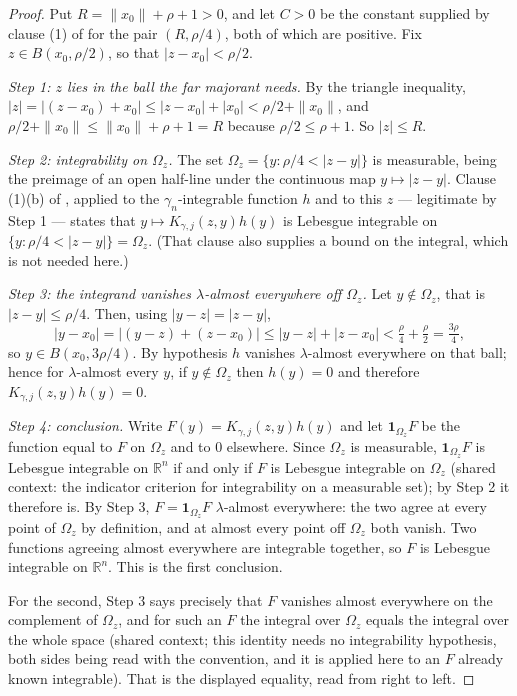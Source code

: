 \begin{proof}
Put $R = \|x_0\| + \rho + 1 > 0$, and let $C > 0$ be the constant supplied by clause (1) of
 for the pair $(R,\rho/4)$, both of which are positive.
Fix $z \in B(x_0,\rho/2)$, so that $|z - x_0| < \rho/2$.

\emph{Step 1: $z$ lies in the ball the far majorant needs.}
By the triangle inequality, $|z| = |(z-x_0) + x_0| \leq |z-x_0| + |x_0| < \rho/2 + \|x_0\|$,
and $\rho/2 + \|x_0\| \leq \|x_0\| + \rho + 1 = R$ because $\rho/2 \leq \rho + 1$.  So
$|z| \leq R$.

\emph{Step 2: integrability on $\Omega_z$.}
The set $\Omega_z = \{y : \rho/4 < |z-y|\}$ is measurable, being the preimage of an open
half-line under the continuous map $y \mapsto |z-y|$.  Clause (1)(b) of
, applied to the $\gamma_n$-integrable function $h$ and to
this $z$ --- legitimate by Step 1 --- states that $y \mapsto K_{\gamma,j}(z,y)h(y)$ is Lebesgue
integrable on $\{y : \rho/4 < |z-y|\} = \Omega_z$.  (That clause also supplies a bound on the
integral, which is not needed here.)

\emph{Step 3: the integrand vanishes $\lambda$-almost everywhere off $\Omega_z$.}
Let $y \notin \Omega_z$, that is $|z-y| \leq \rho/4$.  Then, using $|y-z| = |z-y|$,
\[
  |y-x_0| = |(y-z) + (z-x_0)| \leq |y-z| + |z-x_0| < \tfrac{\rho}{4} + \tfrac{\rho}{2}
    = \tfrac{3\rho}{4} ,
\]
so $y \in B(x_0,3\rho/4)$.  By hypothesis $h$ vanishes $\lambda$-almost everywhere on that
ball; hence for $\lambda$-almost every $y$, if $y \notin \Omega_z$ then $h(y) = 0$ and therefore
$K_{\gamma,j}(z,y)h(y) = 0$.

\emph{Step 4: conclusion.}
Write $F(y) = K_{\gamma,j}(z,y)h(y)$ and let $\mathbf 1_{\Omega_z}F$ be the function equal to
$F$ on $\Omega_z$ and to $0$ elsewhere.  Since $\Omega_z$ is measurable, $\mathbf 1_{\Omega_z}F$
is Lebesgue integrable on $\mathbb{R}^n$ if and only if $F$ is Lebesgue integrable on
$\Omega_z$ (shared context: the indicator criterion for integrability on a measurable set); by
Step 2 it therefore is.  By Step 3, $F = \mathbf 1_{\Omega_z}F$ $\lambda$-almost everywhere: the
two agree at every point of $\Omega_z$ by definition, and at almost every point off $\Omega_z$
both vanish.  Two functions agreeing almost everywhere are integrable together, so $F$ is
Lebesgue integrable on $\mathbb{R}^n$.  This is the first conclusion.

For the second, Step 3 says precisely that $F$ vanishes almost everywhere on the complement of
$\Omega_z$, and for such an $F$ the integral over $\Omega_z$ equals the integral over the whole
space (shared context; this identity needs no integrability hypothesis, both sides being read
with the convention, and it is applied here to an $F$ already known integrable).  That is the
displayed equality, read from right to left.
\end{proof}
